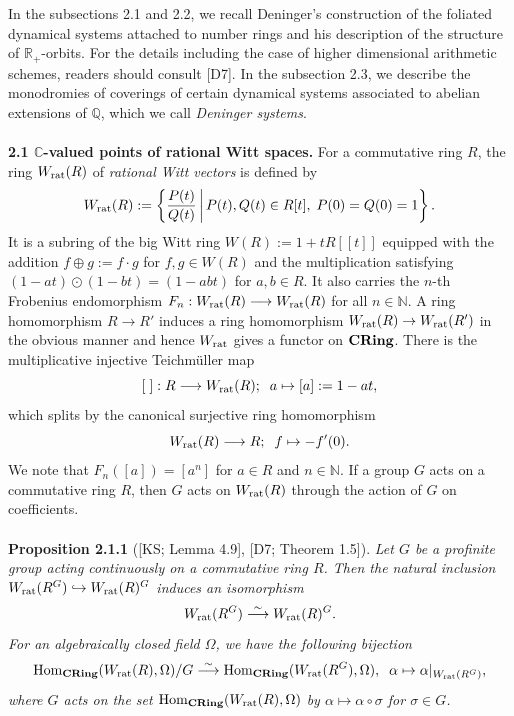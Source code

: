 \documentclass[12pt, leqno]{article}
\begin{document}
In the subsections 2.1 and 2.2, we recall Deninger's construction of the foliated dynamical systems attached to number rings and his description of the structure of $\mathbb{R}_+$-orbits. For the details including the case of higher dimensional arithmetic schemes, readers should consult [D7].   In  the subsection 2.3, we describe the monodromies of coverings of certain dynamical systems associated to abelian extensions of $\mathbb{Q}$, which we call {\it Deninger systems}. \\
\\
{\bf 2.1 $\mathbb{C}$-valued points of rational Witt spaces.} For a commutative ring $R$, the ring $W_{\rm rat}(R)$ of {\it rational Witt vectors}  is defined by 
$$ W_{\rm rat}(R) := \left\{ \frac{P(t)}{Q(t)}\,  \middle| \, P(t), Q(t) \in R[t], \; P(0)=Q(0) = 1 \right\}.$$
It is a subring of the big Witt ring $W(R) := 1 + tR[[t]]$ equipped with the addition
$f \oplus g := f \cdot g$ for $f, g \in W(R)$ and the multiplication satisfying $(1 - at)\odot (1-bt) = (1-abt)$ for $a, b \in R$.  It also carries the $n$-th Frobenius endomorphism $F_n : W_{\rm rat}(R)  \longrightarrow W_{\rm rat}(R)$
 for all $n \in \mathbb{N}$. A ring homomorphism $R \rightarrow R'$ induces a ring homomorphism $W_{\rm rat}(R) \rightarrow W_{\rm rat}(R')$ in the obvious manner and hence $W_{\rm rat}$ gives a functor on ${\bf CRing}$. There is the multiplicative injective Teichm\"{u}ller map
$$ [\; ] : R \longrightarrow W_{\rm rat}(R); \;\; a \mapsto [a] := 1 - at,$$
which splits by the canonical surjective ring homomorphism
$$ W_{\rm rat}(R) \longrightarrow R; \;\; f \mapsto - f'(0).$$
We note that $F_n([a]) = [a^n]$ for $a \in R$ and $n \in \mathbb{N}$. 
If a  group $G$ acts on a commutative ring $R$, then $G$ acts on $W_{\rm rat}(R)$ through the action of $G$ on coefficients. \\
\\
{\bf Proposition 2.1.1} ([KS; Lemma 4.9], [D7; Theorem 1.5]).  {\it Let $G$ be a profinite group acting continuously on a commutative ring $R$. Then the natural inclusion $W_{\rm rat}(R^G) \hookrightarrow W_{\rm rat}(R)^G$ induces an isomorphism} 
$$ W_{\rm rat}(R^G) \stackrel{\sim}{\longrightarrow} W_{\rm rat}(R)^G. $$
 {\it For an algebraically closed field $\Omega$, we have the following bijection}
$$ {\rm Hom}_{\bf CRing}(W_{\rm rat}(R), \Omega)/G \stackrel{\sim}{\longrightarrow} {\rm Hom}_{\bf CRing}(W_{\rm rat}(R^G), \Omega), \;\; \alpha \mapsto \alpha|_{W_{\rm rat}(R^G)}, $$
{\it where $G$ acts on the set ${\rm Hom}_{\bf CRing}(W_{\rm rat}(R),\Omega)$ by $\alpha \mapsto \alpha \circ \sigma$ for $\sigma \in G$.}
\end{document}
